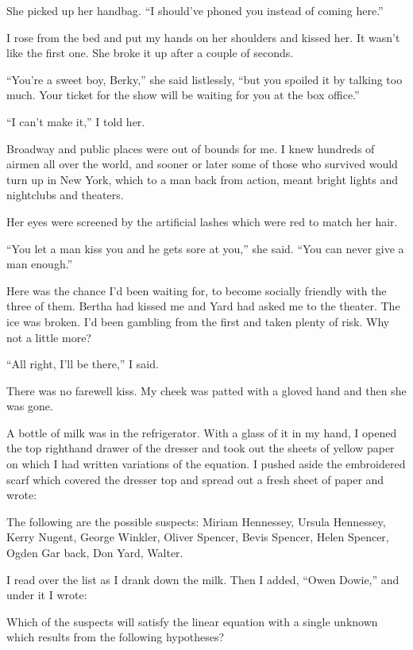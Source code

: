\documentclass{novel}
\begin{document}
She picked up her handbag. “I should’ve phoned you instead of coming here.”

I rose from the bed and put my hands on her shoulders and kissed her. It wasn’t like the first one. She broke it up after a couple of seconds.

“You’re a sweet boy, Berky,” she said listlessly, “but you spoiled it by talking too much. Your ticket for the show will be waiting for you at the box office.”

“I can’t make it,” I told her. 

Broadway and public places were out of bounds for me. I knew hundreds of airmen all over the world, and sooner or later some of those who survived would turn up in New York, which to a man back from action, meant bright lights and nightclubs and theaters.

Her eyes were screened by the artificial lashes which were red to match her hair.

“You let a man kiss you and he gets sore at you,” she said. “You can never give a man enough.”

Here was the chance I’d been waiting for, to become socially friendly with the three of them. Bertha had kissed me and Yard had asked me to the theater. The ice was broken. I’d been gambling from the first and taken plenty of risk. Why not a little more?

“All right, I’ll be there,” I said.

There was no farewell kiss. My cheek was patted with a gloved hand and then she was gone.

\scenestars

A bottle of milk was in the refrigerator. With a glass of it in my hand, I opened the top righthand drawer of the dresser and took out the sheets of yellow paper on which I had written variations of the equation. I pushed aside the embroidered scarf which covered the dresser top and spread out a fresh sheet of paper and wrote:

The following are the possible suspects: Miriam Hennessey, Ursula Hennessey, Kerry Nugent, George Winkler, Oliver Spencer, Bevis Spencer, Helen Spencer, Ogden Gar back, Don Yard, Walter.

I read over the list as I drank down the milk. Then I added, “Owen Dowie,” and under it I wrote:

Which of the suspects will satisfy the linear equation with a single unknown which results from the following hypotheses?

\noindent{}
\end{document}
